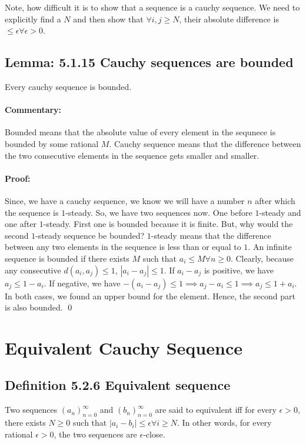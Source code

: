 \documentclass{report}
\begin{document}
Note, how difficult it is to show that a sequence is a cauchy sequence. We need to explicitly find a $N$ and then show that  $\forall i, j \ge N$, their absolute difference is  $\le \epsilon \forall \epsilon > 0$.

\subsection*{Lemma: 5.1.15 Cauchy sequences are bounded}
Every cauchy sequence is bounded. 
\paragraph{Commentary: } Bounded means that the absolute value of every element in the sequnece is bounded by some rational $M$. Cauchy sequence means that the difference between the two consecutive elements in the sequence gets smaller and smaller.

\paragraph{Proof: }Since, we have a cauchy sequence, we know we will have a number $n$ after which the sequence is  $1$-steady. So, we have two sequences now. One before  $1$-steady and one after $1$-steady. First one is bounded because it is finite. But, why would the second  $1$-steady sequence be bounded? $1$-steady means that the difference between any two elements in the sequence is less than or equal to $1$.  An infinite sequence is bounded if there exists $M$ such that  $a_i \le M \forall n \ge 0$. Clearly, because any consecutive $d(a_i, a_j) \le 1$,
$|a_i - a_j| \le 1$. If $a_i - a_j$ is positive, we have  $a_j \le 1 - a_i$. If negative, we have  $-(a_i - a_j) \le 1 \implies a_j - a_i \le 1 \implies a_j \le 1 + a_i$. In both cases, we found an upper bound for the element. Hence, the second part is also bounded. 
\qed


\section{Equivalent Cauchy Sequence}
\subsection*{Definition 5.2.6 Equivalent sequence}
Two sequences $\left( a_n \right)_{n=0}^{\infty} $ and  $\left( b_n \right)_{n=0}^{\infty} $ are said to equivalent iff for every $\epsilon > 0$, there exists  $N \ge 0$ such that $|a_i - b_i| \le \epsilon \forall i \ge N$.  In other words, for every rational $\epsilon > 0$, the two sequences are  $\epsilon$-close.
\end{document}
